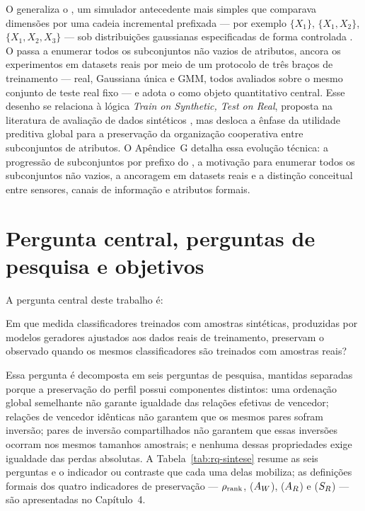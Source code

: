 O \CoInfoSim{} generaliza o \SLACGS{}, um simulador antecedente mais simples que comparava dimensões por uma cadeia incremental prefixada --- por exemplo $\{X_1\}$, $\{X_1,X_2\}$, $\{X_1,X_2,X_3\}$ --- sob distribuições gaussianas especificadas de forma controlada \cite{azevedo2026coinfosim}. O \CoInfoSim{} passa a enumerar todos os subconjuntos não vazios de atributos, ancora os experimentos em datasets reais por meio de um protocolo de três braços de treinamento --- real, Gaussiana única e GMM, todos avaliados sobre o mesmo conjunto de teste real fixo --- e adota o \PredictiveCooperationProfile{} como objeto quantitativo central. Esse desenho se relaciona à lógica \emph{Train on Synthetic, Test on Real}, proposta na literatura de avaliação de dados sintéticos \cite{esteban2017}, mas desloca a ênfase da utilidade preditiva global para a preservação da organização cooperativa entre subconjuntos de atributos. O Apêndice~G detalha essa evolução técnica: a progressão de subconjuntos por prefixo do \SLACGS{}, a motivação para enumerar todos os subconjuntos não vazios, a ancoragem em datasets reais e a distinção conceitual entre sensores, canais de informação e atributos formais.

\section{Pergunta central, perguntas de pesquisa e objetivos}

A pergunta central deste trabalho é:

\begin{researchquestionbox}
Em que medida classificadores treinados com amostras sintéticas, produzidas por modelos geradores ajustados aos dados reais de treinamento, preservam o \PredictiveCooperationProfile{} observado quando os mesmos classificadores são treinados com amostras reais?
\end{researchquestionbox}

Essa pergunta é decomposta em seis perguntas de pesquisa, mantidas separadas porque a preservação do perfil possui componentes distintos: uma ordenação global semelhante não garante igualdade das relações efetivas de vencedor; relações de vencedor idênticas não garantem que os mesmos pares sofram inversão; pares de inversão compartilhados não garantem que essas inversões ocorram nos mesmos tamanhos amostrais; e nenhuma dessas propriedades exige igualdade das perdas absolutas. A Tabela~\ref{tab:rq-sintese} resume as seis perguntas e o indicador ou contraste que cada uma delas mobiliza; as definições formais dos quatro indicadores de preservação --- $\rho_{\mathrm{rank}}$, \WinnersAgreement{} ($A_W$), \ReversalExistenceAgreement{} ($A_R$) e \ReversalSampleSizeSimilarity{} ($S_R$) --- são apresentadas no Capítulo~4.

